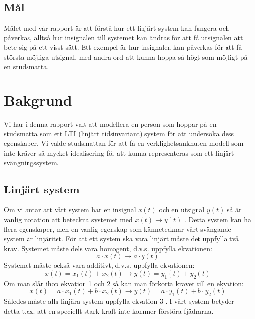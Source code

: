 \documentclass[10pt,a4paper]{article}
\begin{document}
\subsection{Mål}
Målet med vår rapport är att förstå hur ett linjärt system kan fungera och påverkas, alltså hur insignalen till systemet kan ändras för att få utsignalen att bete sig på ett visst sätt. Ett exempel är hur insignalen kan påverkas för att få största möjliga utsignal, med andra ord att kunna hoppa så högt som möjligt på en studsmatta.

\section{Bakgrund}

Vi har i denna rapport valt att modellera en person som hoppar på en studsmatta som ett LTI (linjärt tidsinvariant) system för att undersöka dess egenskaper. Vi valde studsmattan för att få en verklighetsanknuten modell som inte kräver så mycket idealisering för att kunna representeras som ett linjärt svängningssystem.
\newpage

\subsection{Linjärt system}

Om vi antar att vårt system har en insignal $x(t)$ och en utsignal $y(t)$ så är vanlig notation att beteckna systemet med $x(t) \rightarrow y(t)$ \cite[s.~43]{sune2000}. Detta system kan ha flera egenskaper, men en vanlig egenskap som kännetecknar vårt svängande system är linjäritet. För att ett system ska vara linjärt måste det uppfylla två krav. Systemet måste dels vara homogent, d.v.s. uppfylla ekvationen:
\begin{equation}
a \cdot x(t) \rightarrow a \cdot y(t) 
\end{equation}
Systemet måste också vara additivt, d.v.s. uppfylla ekvationen:
\begin{equation}
x(t) = x_1(t) + x_2(t) \rightarrow y(t) = y_1(t) + y_2(t)
\end{equation}
Om man slår ihop ekvation 1 och 2 så kan man förkorta kravet till en ekvation:
\begin{equation}
x(t) = a \cdot x_1(t) + b \cdot x_2(t)\rightarrow y(t) = a \cdot y_1(t) + b \cdot y_2(t)
\end{equation}
\linebreak
Således måste alla linjära system uppfylla ekvation 3 \cite[s.~42]{sune2000}.
I vårt system betyder detta t.ex. att en speciellt stark kraft inte kommer förstöra fjädrarna.
\end{document}
